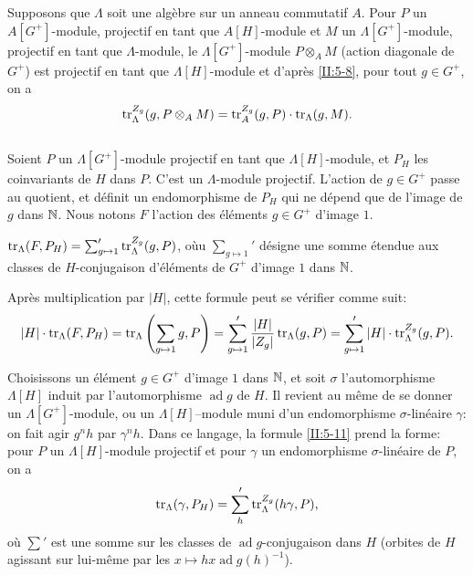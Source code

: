 \documentclass[oneside]{book}
\begin{document}
Supposons que $\Lambda$ soit une alg\`ebre sur un anneau commutatif $A$. Pour 
$P$ un $A[G^+]$-module, projectif en tant que $A[H]$-module et $M$ un 
$\Lambda[G^+]$-module, projectif en tant que $\Lambda$-module, le 
$\Lambda[G^+]$-module $P\otimes_A M$ (action diagonale de $G^+$) est projectif 
en tant que $\Lambda[H]$-module et d'apr\`es \ref{II:5-8}, pour tout 
$g\in G^+$, on a 
\begin{equation}\label{II:eq:5-9-2}
  \operatorname{tr}_\Lambda^{Z_g}(g,P\otimes_A M) = \operatorname{tr}_A^{Z_g}(g,P) \cdot \operatorname{tr}_\Lambda(g,M) \text{.}
\end{equation}





\subsection{}\label{II:5-10}

Soient $P$ un $\Lambda[G^+]$-module projectif en tant que $\Lambda[H]$-module, 
et $P_H$ les coinvariants de $H$ dans $P$. C'est un $\Lambda$-module projectif. 
L'action de $g\in G^+$ passe au quotient, et d\'efinit un endomorphisme de 
$P_H$ qui ne d\'epend que de l'image de $g$ dans $\mathbb{N}$. Nous notons $F$ 
l'action des \'el\'ements $g\in G^+$ d'image $1$. 





\begin{proposition_}\label{II:5-11}
$\operatorname{tr}_\Lambda(F,P_H) = \sum_{g\mapsto 1}' \operatorname{tr}_\Lambda^{Z_g}(g,P)$, o\`uu 
$\sum_{g\mapsto 1}'$ d\'esigne une somme \'etendue aux classes de 
$H$-conjugaison d'\'el\'ements de $G^+$ d'image $1$ dans $\mathbb{N}$. 
\end{proposition_}

Apr\`es multiplication par $|H|$, cette formule peut se v\'erifier comme suit: 
\[
  |H|\cdot \operatorname{tr}_\Lambda(F,P_H) 
    = \operatorname{tr}_\Lambda\left(\sum_{g\mapsto 1} g,P\right) 
    = \sum_{g\mapsto 1}' \frac{|H|}{|Z_g|}\operatorname{tr}_\Lambda(g,P) 
    = \sum_{g\mapsto 1}' |H|\cdot \operatorname{tr}_\Lambda^{Z_g}(g,P) \text{.}
\]

Choisissons un \'el\'ement $g\in G^+$ d'image $1$ dans $\mathbb{N}$, et soit 
$\sigma$ l'automorphisme $\Lambda[H]$ induit par l'automorphisme 
$\operatorname{ad} g$ de $H$. Il revient au m\^eme de se donner un 
$\Lambda[G^+]$-module, ou un $\Lambda[H]$--module muni d'un endomorphisme 
$\sigma$-lin\'eaire $\gamma$: on fait agir $g^n h$ par $\gamma^n h$. Dans ce 
langage, la formule \ref{II:5-11} prend la forme: pour $P$ un 
$\Lambda[H]$-module projectif et pour $\gamma$ un endomorphisme 
$\sigma$-lin\'eaire de $P$, on a 
\[
  \operatorname{tr}_\Lambda(\gamma,P_H) = \sum_h' \operatorname{tr}_\Lambda^{Z_g}(h\gamma,P)\text{,}
\]
o\`u $\sum'$ est une somme sur les classes de $\operatorname{ad}g$-conjugaison 
dans $H$ (orbites de $H$ agissant sur lui-m\^eme par les 
$x\mapsto h x \operatorname{ad} g(h)^{-1}$). 
\end{document}

